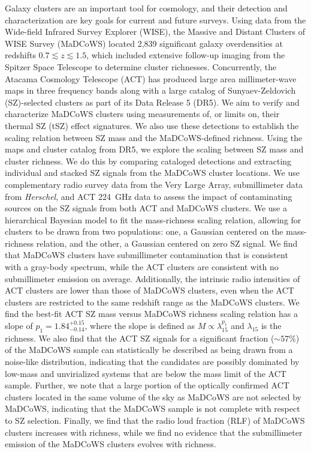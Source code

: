 \documentclass[longauth]{aa} %
\begin{document}
  \abstract
   {Galaxy clusters are an important tool for cosmology, and their detection and characterization are key goals for current and future surveys.
   Using data from the Wide-field Infrared Survey Explorer (WISE), the Massive and Distant Clusters of WISE Survey (MaDCoWS) located 2,839 significant galaxy overdensities at redshifts $0.7\lesssim z\lesssim 1.5$, which included extensive follow-up imaging from the Spitzer Space Telescope to determine cluster richnesses. Concurrently, the Atacama Cosmology Telescope (ACT) has produced large area millimeter-wave maps in three frequency bands along with a large catalog of Sunyaev-Zeldovich (SZ)-selected clusters as part of its Data Release 5 (DR5).}
   {We aim to verify and characterize MaDCoWS clusters using measurements of, or limits on, their thermal SZ (tSZ) effect signatures.  We also use these detections to establish the scaling relation between SZ mass and the MaDCoWS-defined richness.}
   {Using the maps and cluster catalog from DR5, we explore the scaling between SZ mass and cluster richness.  We do this by comparing cataloged detections and extracting individual and stacked SZ signals from the MaDCoWS cluster locations. We use complementary radio survey data from the Very Large Array, submillimeter data from {\it Herschel}, and ACT 224~GHz data to assess the impact of contaminating sources on the SZ signals from both ACT and MaDCoWS clusters. We use a hierarchical Bayesian model to fit the mass-richness scaling relation, allowing for clusters to be drawn from two populations: one, a Gaussian centered on the mass-richness relation, and the other, a Gaussian centered on zero SZ signal.}
   {We find that MaDCoWS clusters have submillimeter contamination that is consistent with a gray-body spectrum, while the ACT clusters are consistent with no submillimeter emission on average. Additionally, the intrinsic radio intensities of ACT clusters are lower than those of MaDCoWS clusters, even when the ACT clusters are restricted to the same redshift range as the MaDCoWS clusters. We find the best-fit ACT SZ mass versus MaDCoWS richness scaling relation has a slope of $p_1 = 1.84^{+0.15}_{-0.14}$, where the slope is defined as $M\propto \lambda_{15}^{p_1}$ and $\lambda_{15}$ is the richness.  We also find that the ACT SZ signals for a significant fraction ($\sim57\%$) of the MaDCoWS sample can statistically be described as being drawn from a noise-like distribution, indicating that the candidates are possibly dominated by low-mass and unvirialized systems that are below the mass limit of the ACT sample. Further, we note that a large portion of the optically confirmed ACT clusters located in the same volume of the sky as MaDCoWS are not selected by MaDCoWS, indicating that the MaDCoWS sample is not complete with respect to SZ selection. Finally, we find that the radio loud fraction (RLF) of MaDCoWS clusters increases with richness, while we find no evidence that the submillimeter emission of the MaDCoWS clusters evolves with richness.}
\end{document}
